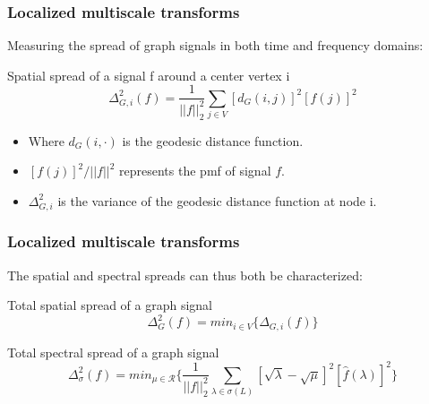 \documentclass{beamer}
\begin{document}
\begin{frame}
  \frametitle{Localized multiscale transforms}

  Measuring the spread of graph signals in both time and frequency domains:

  \begin{block}{Spatial spread of a signal f around a center vertex i}
    \begin{equation}
      \Delta_{G,i}^2(f) = \frac{1}{|| f ||_2^2} \sum_{j \in V} [d_G(i, j)]^2 [f(j)]^2
    \end{equation}
  \end{block}  

  \begin{itemize}
  \item Where $d_G(i, \cdot)$ is the geodesic distance function.
  \item $[f(j)]^2 / || f ||^2$ represents the pmf of signal $f$.
  \item $\Delta_{G, i}^2$ is the variance of the geodesic distance function at
    node i.
  \end{itemize}
\end{frame}

\begin{frame}
  \frametitle{Localized multiscale transforms}
  
  The spatial and spectral spreads can thus both be characterized:

  \begin{block}{Total spatial spread of a graph signal}
    \begin{equation}
      \Delta_{G}^2(f) = min_{i \in V} \{ \Delta_{G, i} (f) \}
    \end{equation}
  \end{block}  
  \begin{block}{Total spectral spread of a graph signal}
    \begin{equation}
      \Delta_{\sigma}^2(f) = min_{\mu \in \mathcal{R}} \bigg\{ \frac{1}{|| f ||_2^2} \sum_{\lambda \in \sigma(L)} [\sqrt{\lambda} - \sqrt{\mu}]^2 [\hat{f}(\lambda)]^2 \bigg\}
    \end{equation}
  \end{block}  
 \end{frame} 
  
\end{document}
